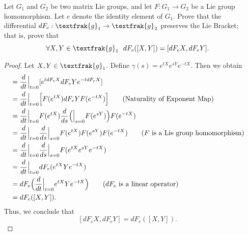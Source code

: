 \documentclass{article}
\begin{document}
\begin{problem}
    Let \( {G}_{1} \) and \( {G}_{2} \) be two matrix Lie groups, and let \( F: {G}_{1} \to {G}_{2} \) be a Lie group homomorphism. Let \( e  \) denote the identity element of \( {G}_{1} \). Prove that the differential \( d {F}_{e} : {\textfrak{g}}_{1} \to {\textfrak{g}}_{2} \) preserves the Lie Bracket; that is, prove that  
    \[  \forall X,Y \in {\textfrak{g}}_{1} \ \ d {F}_{e}([X,Y]) = [d {F}_{e} X , d {F}_{e} Y ]. \]
\end{problem}
\begin{proof}
    Let \( X,Y \in {\textfrak{g}}_{1} \). Define \( \gamma(s) =  e^{tX} e^{sY} e^{-tX} \). Then we obtain
\begin{align*}
    [d {F}_{e} X , d {F}_{e} Y ] &= \frac{ d }{ dt  } \Big|_{t = 0} [ e^{t d {F}_{e} X } d {F}_{e} Y e^{-t d {F}_{e}X}] \\
                                 &= \frac{ d }{ dt } \Big|_{t = 0} \Big[ F(e^{tX}) d {F}_{e} Y F(e^{-tX}) \Big] \tag{Naturality of Exponent Map} \\
                                 &= \frac{ d }{ dt }  \Big|_{t = 0} F(e^{tX}) \frac{ d }{ ds } \Big( \Big|_{s = 0} F(e^{sY}) \Big) F(e^{-tX}) \\
                                 &= \frac{ d }{ dt } \Big|_{t = 0} \frac{ d }{ ds } \Big|_{s = 0} F(e^{tX}) F(e^{sY}) F(e^{-tX}) \tag{\( F  \) is a Lie group homomorphism} \\
                                 &= \frac{ d }{ dt } \Big|_{t = 0} \frac{ d }{ ds } \Big|_{s = 0} F(e^{tX} e^{sY} e^{-tX}) \\
                                 &= \frac{ d }{ dt } \Big|_{t = 0} d {F}_{e}(e^{tX} Y e^{-tX}) \\
                                 &=  d {F}_{e} \Big(  \frac{ d }{ dt } \Big|_{t = 0} e^{tX} Y e^{-tX} \Big) \tag{\( d {F}_{e} \) is a linear operator} \\
                                 &= d {F}_{e}([X,Y]).
\end{align*}
Thus, we conclude that 
\[  [d {F}_{e}X , d {F}_{e} Y ] = d {F}_{e}([X,Y]). \]
\end{proof}
\end{document}
